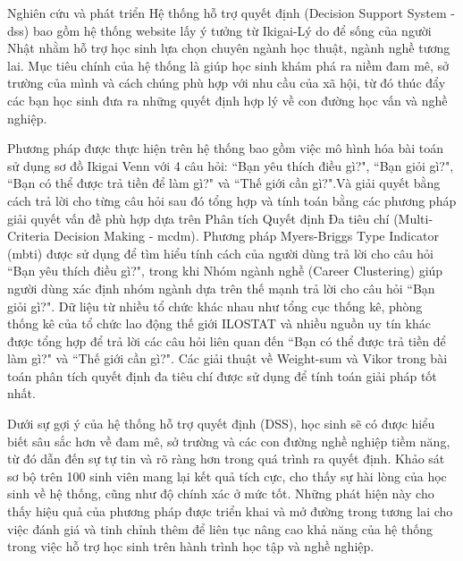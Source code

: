 Nghiên cứu và phát triển Hệ thống hỗ trợ quyết định (Decision Support System - \acrshort{dss}) bao gồm hệ thống website lấy ý tưởng từ Ikigai-Lý do để sống của người Nhật nhằm hỗ trợ học sinh lựa chọn chuyên ngành học thuật, ngành nghề tương lai. Mục tiêu chính của hệ thống là giúp học sinh khám phá ra niềm đam mê, sở trường của mình và cách chúng phù hợp với nhu cầu của xã hội, từ đó thúc đẩy các bạn học sinh đưa ra những quyết định hợp lý về con đường học vấn và nghề nghiệp.

Phương pháp được thực hiện trên hệ thống bao gồm việc mô hình hóa bài toán sử dụng sơ đồ Ikigai Venn với 4 câu hỏi: ``Bạn yêu thích điều gì?", ``Bạn giỏi gì?", ``Bạn có thể được trả tiền để làm gì?" và ``Thế giới cần gì?".Và giải quyết bằng cách trả lời cho từng câu hỏi sau đó tổng hợp và tính toán bằng các phương pháp giải quyết vấn đề phù hợp dựa trên Phân tích Quyết định Đa tiêu chí (Multi-Criteria Decision Making - \acrshort{mcdm}). Phương pháp Myers-Briggs Type Indicator (\acrshort{mbti}) được sử dụng để tìm hiểu tính cách của người dùng trả lời cho câu hỏi ``Bạn yêu thích điều gì?", trong khi Nhóm ngành nghề (Career Clustering) giúp người dùng xác định nhóm ngành dựa trên thế mạnh trả lời cho câu hỏi ``Bạn giỏi gì?". Dữ liệu từ nhiều tổ chức khác nhau như tổng cục thống kê, phòng thống kê của tổ chức lao động thế giới ILOSTAT và nhiều nguồn uy tín khác được tổng hợp để trả lời các câu hỏi liên quan đến ``Bạn có thể được trả tiền để làm gì?" và ``Thế giới cần gì?". Các giải thuật về Weight-sum và Vikor trong bài toán phân tích quyết định đa tiêu chí được sử dụng để tính toán giải pháp tốt nhất.

Dưới sự gợi ý của hệ thống hỗ trợ quyết định (DSS), học sinh sẽ có được hiểu biết sâu sắc hơn về đam mê, sở trường và các con đường nghề nghiệp tiềm năng, từ đó dẫn đến sự tự tin và rõ ràng hơn trong quá trình ra quyết định. Khảo sát sơ bộ trên 100 sinh viên mang lại kết quả tích cực, cho thấy sự hài lòng của học sinh về hệ thống, cũng như độ chính xác ở mức tốt. Những phát hiện này cho thấy hiệu quả của phương pháp được triển khai và mở đường trong tương lai cho việc đánh giá và tinh chỉnh thêm để liên tục nâng cao khả năng của hệ thống trong việc hỗ trợ học sinh trên hành trình học tập và nghề nghiệp.